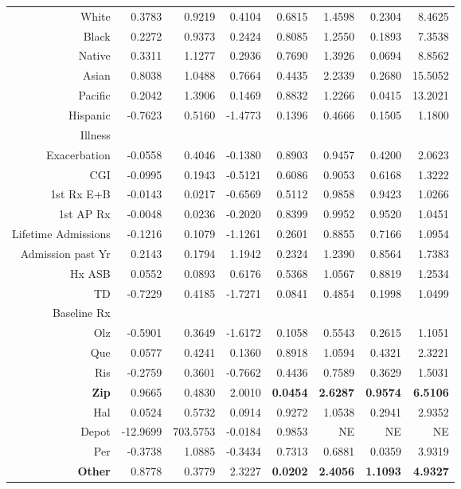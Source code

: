\documentclass[a4paper,nobib]{article}
\begin{document}
\begin{table}[!hbtp]
\begin{center}
\begin{normalsize}
\begin{tabular}{rrrrrrrr}
White &0.3783&0.9219&0.4104&0.6815&1.4598&0.2304&8.4625\\ 
Black &0.2272&0.9373&0.2424&0.8085&1.2550&0.1893&7.3538\\ 
Native &0.3311&1.1277&0.2936&0.7690&1.3926&0.0694&8.8562\\ 
Asian &0.8038&1.0488&0.7664&0.4435&2.2339&0.2680&15.5052\\ 
Pacific &0.2042&1.3906&0.1469&0.8832&1.2266&0.0415&13.2021\\ 
Hispanic &-0.7623&0.5160&-1.4773&0.1396&0.4666&0.1505&1.1800\\ 
\hline
Illness\\
\hline
Exacerbation &-0.0558&0.4046&-0.1380&0.8903&0.9457&0.4200&2.0623\\ 
CGI &-0.0995&0.1943&-0.5121&0.6086&0.9053&0.6168&1.3222\\ 
1st Rx E+B &-0.0143&0.0217&-0.6569&0.5112&0.9858&0.9423&1.0266\\ 
1st AP Rx &-0.0048&0.0236&-0.2020&0.8399&0.9952&0.9520&1.0451\\ 
Lifetime Admissions &-0.1216&0.1079&-1.1261&0.2601&0.8855&0.7166&1.0954\\ 
Admission past Yr &0.2143&0.1794&1.1942&0.2324&1.2390&0.8564&1.7383\\ 
Hx ASB &0.0552&0.0893&0.6176&0.5368&1.0567&0.8819&1.2534\\ 
TD &-0.7229&0.4185&-1.7271&0.0841&0.4854&0.1998&1.0499\\  
\hline
Baseline Rx\\
\hline
Olz &-0.5901&0.3649&-1.6172&0.1058&0.5543&0.2615&1.1051\\ 
Que &0.0577&0.4241&0.1360&0.8918&1.0594&0.4321&2.3221\\ 
Ris &-0.2759&0.3601&-0.7662&0.4436&0.7589&0.3629&1.5031\\ 
\textbf{Zip} &0.9665&0.4830&2.0010& \textbf{0.0454} & \textbf{2.6287} & \textbf{0.9574} & \textbf{6.5106} \\ 
Hal &0.0524&0.5732&0.0914&0.9272&1.0538&0.2941&2.9352\\ 
Depot &-12.9699&703.5753&-0.0184&0.9853& NE & NE & NE \\ 
Per &-0.3738&1.0885&-0.3434&0.7313&0.6881&0.0359&3.9319\\ 
\textbf{Other} & 0.8778&0.3779&2.3227& \textbf{0.0202} & \textbf{2.4056} & \textbf{1.1093} & \textbf{4.9327}\\ 
\hline
			\end{tabular}
		\end{normalsize}
	\end{center}

\end{table}
\end{document}
